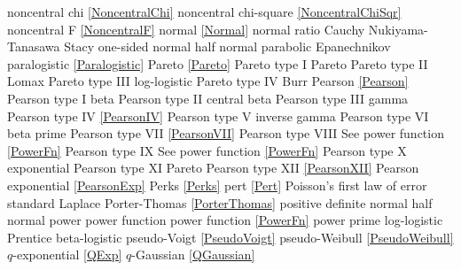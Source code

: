 noncentral chi					\dotfill	\eqref{NoncentralChi}				\ncite
noncentral chi-square			\dotfill	\eqref{NoncentralChiSqr}			\ncite
noncentral F					\dotfill	\eqref{NoncentralF}					\ncite	%
normal 							\dotfill	\eqref{Normal}						\ncite	%
normal ratio  					\dotfill	Cauchy 								\ncite	%
Nukiyama-Tanasawa 				\dotfill	Stacy 								   	%
%
one-sided normal  				\dotfill	half normal							\ncite	%
parabolic						\dotfill	Epanechnikov						\ncite
paralogistic					\dotfill	\eqref{Paralogistic} 				\ncite	%
Pareto							\dotfill	\eqref{Pareto}						\ncite	%
Pareto type I					\dotfill	Pareto								\ncite	%
Pareto type II					\dotfill	Lomax 								\ncite	%
Pareto type III					\dotfill	log-logistic						\ncite	%
Pareto type IV					\dotfill	Burr								\ncite	%
Pearson			 				\dotfill	\eqref{Pearson}						\ncite	%
Pearson type I					\dotfill	beta 								\ncite	%
Pearson type II					\dotfill	central beta						\ncite	%
Pearson type III   				\dotfill	gamma 								\ncite	%
Pearson type IV   				\dotfill	\eqref{PearsonIV} 					\ncite	%
Pearson type V    				\dotfill	inverse gamma						\ncite	%
Pearson type VI					\dotfill	beta prime 							\ncite	%
Pearson type VII				\dotfill	\eqref{PearsonVII} 					\ncite	%
Pearson type VIII				\dotfill	See power function \eqref{PowerFn}	\ncite	%
Pearson type IX					\dotfill	See power function \eqref{PowerFn}	\ncite	%
Pearson type X    				\dotfill	exponential							\ncite	%
Pearson type XI    				\dotfill	Pareto								
Pearson type XII 				\dotfill	\eqref{PearsonXII}					\ncite	%
Pearson exponential				\dotfill	\eqref{PearsonExp}					\mcite{\self}
Perks							\dotfill	\eqref{Perks} 						\ncite	%
pert							\dotfill	\eqref{Pert} 						\ncite	%
Poisson's first law of error	\dotfill	standard Laplace					\ncite	%
Porter-Thomas					\dotfill	\eqref{PorterThomas}				\ncite
positive definite normal 		\dotfill	half normal 						\ncite 	%
power							\dotfill	power function 						\ncite	%
power function					\dotfill	\eqref{PowerFn}						\ncite	%
power prime						\dotfill	log-logistic						\mcite{\self}
Prentice 						\dotfill	beta-logistic							
pseudo-Voigt					\dotfill	\eqref{PseudoVoigt}					\ncite
pseudo-Weibull					\dotfill	\eqref{PseudoWeibull}				\ncite	%
%
$q$-exponential					\dotfill	\eqref{QExp}						\ncite	%
$q$-Gaussian					\dotfill	\eqref{QGaussian}					\ncite	%
